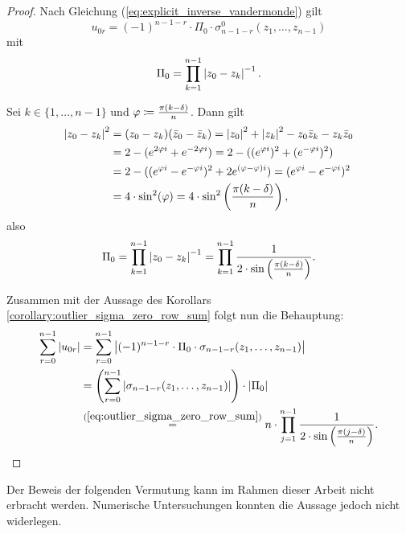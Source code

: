 \begin{proof}
    Nach Gleichung (\ref{eq:explicit_inverse_vandermonde}) gilt
    \[
        u_{0r} = (-1)^{n-1-r} \cdot \Pi_0 \cdot \sigma_{n-1-r}^{0}(z_1, \dots, z_{n-1})
    \]
    mit
    \[
        \Pi_0 = \prod_{k=1}^{n-1} \left\lvert  z_0 - z_k  \right\rvert^{-1}.
    \]

    \noindent Sei $k \in \{1, \dots, n-1\}$ und $\varphi \coloneqq \frac{\pi (k - \delta)}{n}$.
    Dann gilt
    \[
        \begin{split}
            \left\lvert z_0 - z_k \right\rvert^2
            &= (z_0 - z_k) (\bar{z}_0 - \bar{z}_k)
            = \left\lvert z_0 \right\rvert^2 + \left\lvert z_k \right\rvert^2 - z_0\bar{z}_k - z_k\bar{z}_0\\
            &= 2 - (e^{2 \varphi i} + e^{-2 \varphi i})
            = 2 - ((e^{\varphi i})^2 + (e^{-\varphi i})^2)\\
            &= 2 - ( (e^{\varphi i} - e^{-\varphi i})^2 + 2 e^{(\varphi - \varphi) i})
            = (e^{\varphi i} - e^{-\varphi i})^2\\
            &= 4 \cdot \sin^2 (\varphi)
            = 4 \cdot \sin^2 \left( \frac{\pi (k-\delta)}{n} \right),
        \end{split}
    \]
    also
    \begin{equation}
        \label{eq:pi_0}
        \Pi_0
        = \prod_{\substack{k = 1}}^{n-1} \left\lvert  z_0 - z_k  \right\rvert^{-1}
        = \prod_{\substack{k = 1}}^{n-1} \frac{1}{2 \cdot \sin \left( \frac{\pi (k-\delta)}{n} \right)}.
    \end{equation}

    \noindent Zusammen mit der Aussage des Korollars
    \ref{corollary:outlier_sigma_zero_row_sum} folgt nun die Behauptung:
    \[
        \begin{split}
            \sum_{r=0}^{n-1} \left\lvert  u_{0r}  \right\rvert
            &= \sum_{r=0}^{n-1} \left\lvert  (-1)^{n-1-r} \cdot \Pi_0 \cdot \sigma_{n-1-r}(z_1, \dots, z_{n-1})  \right\rvert\\
            &= \left( \sum_{r=0}^{n-1} \left\lvert  \sigma_{n-1-r}(z_1, \dots, z_{n-1})  \right\rvert \right) \cdot \left\lvert \Pi_0 \right\rvert\\
            &\overset{(\ref{eq:outlier_sigma_zero_row_sum})}{=}
                n \cdot \prod_{j=1}^{n-1} \frac{1}{2 \cdot \sin \left(\frac{\pi (j - \delta)}{n} \right)}.
        \end{split}
    \]
\end{proof}

Der Beweis der folgenden Vermutung kann im Rahmen dieser Arbeit nicht
erbracht werden. Numerische Untersuchungen konnten die Aussage jedoch nicht
widerlegen.

